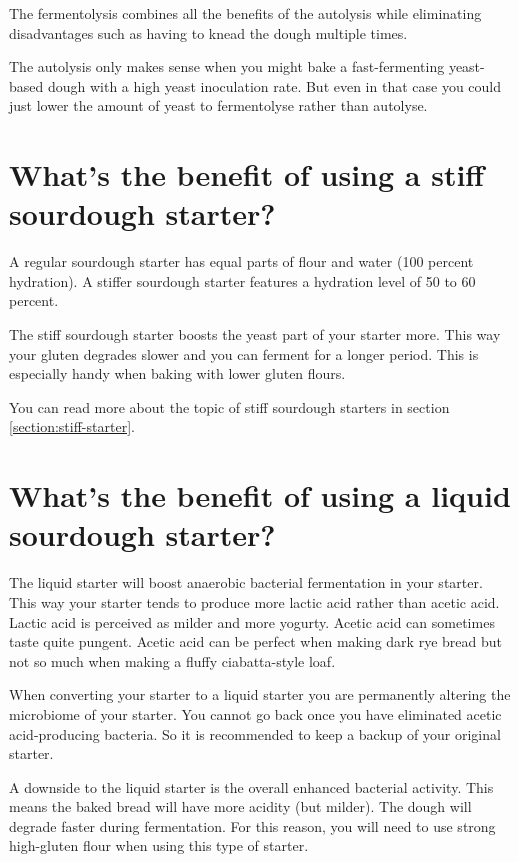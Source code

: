 The fermentolysis combines all the benefits
of the autolysis while eliminating disadvantages
such as having to knead the dough multiple times.

The autolysis only makes sense when you might
bake a fast-fermenting yeast-based dough with a
high yeast inoculation rate. But even in that
case you could just lower the amount of yeast
to fermentolyse rather than autolyse.

\section{What's the benefit of using a stiff sourdough starter?}

A regular sourdough starter has equal parts of
flour and water (100 percent hydration). A stiffer
sourdough starter features a hydration level of 50 to 60 percent.

The stiff sourdough starter boosts the yeast part
of your starter more. This way your gluten degrades
slower and you can ferment for a longer period. This
is especially handy when baking with lower gluten flours.

You can read more about the topic of stiff sourdough
starters in section \ref{section:stiff-starter}.

\section{What's the benefit of using a liquid sourdough starter?}

The liquid starter will boost anaerobic bacterial
fermentation in your starter. This way your starter
tends to produce more lactic acid rather than acetic
acid. Lactic acid is perceived as milder and more
yogurty. Acetic acid can sometimes taste quite
pungent.  Acetic acid can be perfect when making 
dark rye bread but not so much when making a fluffy
ciabatta-style loaf.

When converting your starter to a liquid starter you are
permanently altering the microbiome of your starter.
You cannot go back once you have eliminated acetic
acid-producing bacteria. So it is recommended to keep
a backup of your original starter.

A downside to the liquid starter is the overall
enhanced bacterial activity. This means the baked bread
will have more acidity (but milder). The dough will degrade
faster during fermentation. For this reason, you
will need to use strong high-gluten flour when using
this type of starter.

